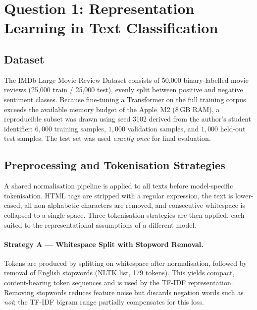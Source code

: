 
\section{Question 1: Representation Learning in Text Classification}

\subsection{Dataset}

The IMDb Large Movie Review Dataset \cite{maas2011imdb} consists of 50{,}000
binary-labelled movie reviews (25{,}000 train / 25{,}000 test), evenly split
between positive and negative sentiment classes. Because fine-tuning a
Transformer on the full training corpus exceeds the available memory budget
of the Apple~M2 (8\,GB RAM), a reproducible subset was drawn using seed 3102
derived from the author's student identifier: $6{,}000$ training samples,
$1{,}000$ validation samples, and $1{,}000$ held-out test samples. The test
set was used \emph{exactly once} for final evaluation.

\subsection{Preprocessing and Tokenisation Strategies}

A shared normalisation pipeline is applied to all texts before
model-specific tokenisation. HTML tags are stripped with a regular
expression, the text is lower-cased, all non-alphabetic characters are
removed, and consecutive whitespace is collapsed to a single space. Three
tokenisation strategies are then applied, each suited to the
representational assumptions of a different model.

\paragraph{Strategy A — Whitespace Split with Stopword Removal.}
Tokens are produced by splitting on whitespace after normalisation,
followed by removal of English stopwords (NLTK list, 179 tokens). This
yields compact, content-bearing token sequences and is used by the TF-IDF
representation. Removing stopwords reduces feature noise but discards
negation words such as \textit{not}; the TF-IDF bigram range partially
compensates for this loss.

